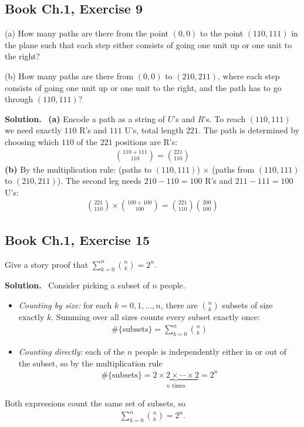 \documentclass[11pt]{article}
\newcommand{\Sol}{\vspace{2pt}\noindent\textbf{Solution.}\ }
\begin{document}
\subsection{Book Ch.1, Exercise 9}
\begin{qbox}
(a) How many paths are there from the point $(0,0)$ to the point $(110,111)$ in the plane such that each step either consists of going one unit up or one unit to the right?

(b) How many paths are there from $(0,0)$ to $(210,211)$, where each step consists of going one unit up or one unit to the right, and the path has to go through $(110,111)$?
\end{qbox}
\Sol
\textbf{(a)} Encode a path as a string of $U$'s and $R$'s. To reach $(110,111)$ we need exactly $110$ R's and $111$ U's, total length $221$. The path is determined by choosing which $110$ of the $221$ positions are R's:
\begin{align*}
\binom{110+111}{110} = \binom{221}{110}
\end{align*}
\textbf{(b)} By the multiplication rule: (paths to $(110,111)$) $\times$ (paths from $(110,111)$ to $(210,211)$). The second leg needs $210-110=100$ R's and $211-111=100$ U's:
\begin{align*}
\binom{221}{110}\times\binom{100+100}{100} = \binom{221}{110}\binom{200}{100}
\end{align*}

\subsection{Book Ch.1, Exercise 15}
\begin{qbox}
Give a story proof that $\displaystyle\sum_{k=0}^n \binom{n}{k}=2^n$.
\end{qbox}
\Sol
Consider picking a subset of $n$ people.
\begin{itemize}[leftmargin=1.3em]
\item \emph{Counting by size:} for each $k=0,1,\dots,n$, there are $\binom{n}{k}$ subsets of size exactly $k$. Summing over all sizes counts every subset exactly once:
\begin{align*}
\#\{\text{subsets}\} = \sum_{k=0}^n \binom{n}{k}
\end{align*}
\item \emph{Counting directly:} each of the $n$ people is independently either in or out of the subset, so by the multiplication rule
\begin{align*}
\#\{\text{subsets}\} = \underbrace{2\times 2\times\cdots\times 2}_{n \text{ times}} = 2^n
\end{align*}
\end{itemize}
Both expressions count the same set of subsets, so
\begin{align*}
\sum_{k=0}^n \binom{n}{k} = 2^n.
\end{align*}
\end{document}
